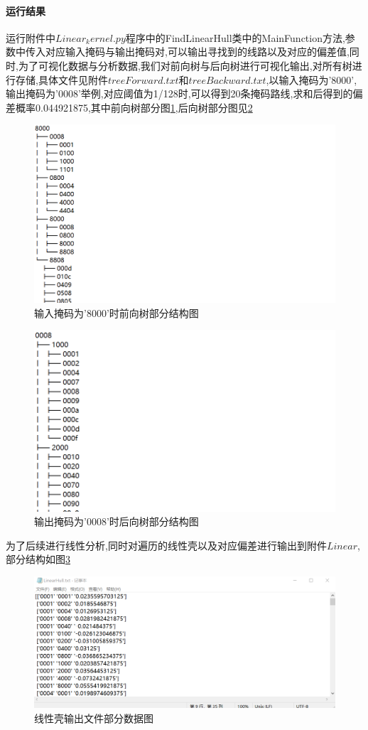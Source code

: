 \documentclass[UTF-8]{ctexart}
\begin{document}
\paragraph{运行结果}

运行附件中$Linear_kernel.py$程序中的FindLinearHull类中的MainFunction方法,参数中传入对应输入掩码与输出掩码对,可以输出寻找到的线路以及对应的偏差值,同时,为了可视化数据与分析数据,我们对前向树与后向树进行可视化输出,对所有树进行存储,具体文件见附件$treeForward.txt$和$treeBackward.txt$,以输入掩码为'8000',输出掩码为'0008'举例,对应阈值为1/128时,可以得到20条掩码路线,求和后得到的偏差概率0.044921875,其中前向树部分图\cref{fig:F},后向树部分图见\cref{fig:B}
	\begin{figure}[!htbp]
	\centering
	\includegraphics[width=0.7\linewidth]{treeF}
	\caption{输入掩码为'8000'时前向树部分结构图}
	\label{fig:F}
\end{figure}
\begin{figure}[!htbp]
	\centering
	\includegraphics[width=0.7\linewidth]{treeB}
	\caption{输出掩码为'0008'时后向树部分结构图}
	\label{fig:B}
\end{figure}
为了后续进行线性分析,同时对遍历的线性壳以及对应偏差进行输出到附件$Linear$,部分结构如图\cref{fig:hull}
\begin{figure}[!htbp]
	\centering
	\includegraphics[width=0.7\linewidth]{Hull}
	\caption{线性壳输出文件部分数据图}
	\label{fig:hull}
\end{figure}
\end{document}
